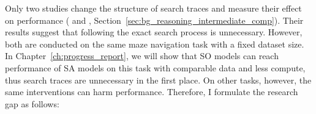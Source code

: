 Only two studies change the structure of search traces and measure their effect on performance (\citeauthor{suDualformerControllableFast2025} and \citeauthor{valmeekamSemanticsUnreasonableEffectiveness2025}, Section~\ref{sec:bg_reasoning_intermediate_comp}).
Their results suggest that following the exact search process is unnecessary.
However, both are conducted on the same maze navigation task with a fixed dataset size.
In Chapter~\ref{ch:progress_report}, we will show that SO models can reach performance of SA models on this task with comparable data and less compute, thus search traces are unnecessary in the first place.
On other tasks, however, the same interventions can harm performance.
Therefore, I formulate the research gap as follows:

